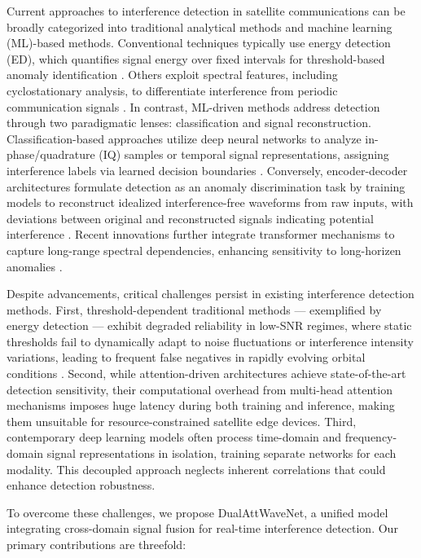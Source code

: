 \documentclass[conference]{IEEEtran}
\begin{document}
Current approaches to interference detection in satellite communications can be broadly categorized into traditional analytical methods and machine learning (ML)-based methods. Conventional techniques typically use  energy detection (ED), which quantifies signal energy over fixed intervals for threshold-based anomaly identification \cite{kay2009fundamentals}. Others exploit spectral features, including cyclostationary analysis, to differentiate interference from periodic communication signals \cite{experimentalCyclostationary}. In contrast, ML-driven methods address detection through two paradigmatic lenses: classification and signal reconstruction. Classification-based approaches utilize deep neural networks to analyze in-phase/quadrature (IQ) samples or temporal signal representations, assigning interference labels via learned decision boundaries \cite{pellacoSpectrumPredictionInterference2019}. Conversely, encoder-decoder architectures formulate detection as an anomaly discrimination task by training models to reconstruct idealized interference-free waveforms from raw inputs, with deviations between original and reconstructed signals indicating potential interference \cite{saifaldawlaConvolutionalAutoencodersNonGeostationary2024}. Recent innovations further integrate transformer mechanisms to capture long-range spectral dependencies, enhancing sensitivity to long-horizen anomalies \cite{saifaldawlaGenAIBasedModelsNGSO2024}.


Despite advancements, critical challenges persist in existing interference detection methods. First, threshold-dependent traditional methods — exemplified by energy detection — exhibit degraded reliability in low-SNR regimes, where static thresholds fail to dynamically adapt to noise fluctuations or interference intensity variations, leading to frequent false negatives in rapidly evolving orbital conditions \cite{saifaldawlaGenAIBasedModelsNGSO2024}. Second, while attention-driven architectures achieve state-of-the-art detection sensitivity, their computational overhead from multi-head attention mechanisms imposes huge latency during both training and inference, making them unsuitable for resource-constrained satellite edge devices. Third, contemporary deep learning models often process time-domain and frequency-domain signal representations in isolation, training separate networks for each modality. This decoupled approach neglects inherent correlations that could enhance detection robustness.

To overcome these challenges, we propose DualAttWaveNet, a unified model integrating cross-domain signal fusion for real-time interference detection. Our primary contributions are threefold:
\end{document}
